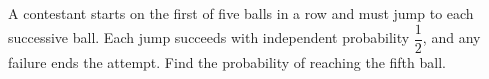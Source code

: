 A contestant starts on the first of five balls in a row and must jump to each successive ball. Each jump succeeds with independent probability $\dfrac{1}{2}$, and any failure ends the attempt. Find the probability of reaching the fifth ball.
